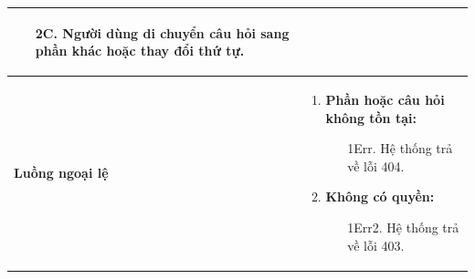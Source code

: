 {\begin{tabularx}{\textwidth}{|>{\raggedright\arraybackslash}p{3.5cm}|>{\raggedright\arraybackslash}X|}
\begin{enumerate}
    \begin{enumerate}
        \item[2C.] Người dùng di chuyển câu hỏi sang phần khác hoặc thay đổi thứ tự.
    \end{enumerate}
\end{enumerate} \\
\hline
\textbf{Luồng ngoại lệ} &
\begin{enumerate}
    \item \textbf{Phần hoặc câu hỏi không tồn tại:}
    \begin{enumerate}
        \item[1Err.] Hệ thống trả về lỗi 404.
    \end{enumerate}
    \item \textbf{Không có quyền:}
    \begin{enumerate}
        \item[1Err2.] Hệ thống trả về lỗi 403.
    \end{enumerate}
\end{enumerate} \\
\hline
\end{tabularx}
}
